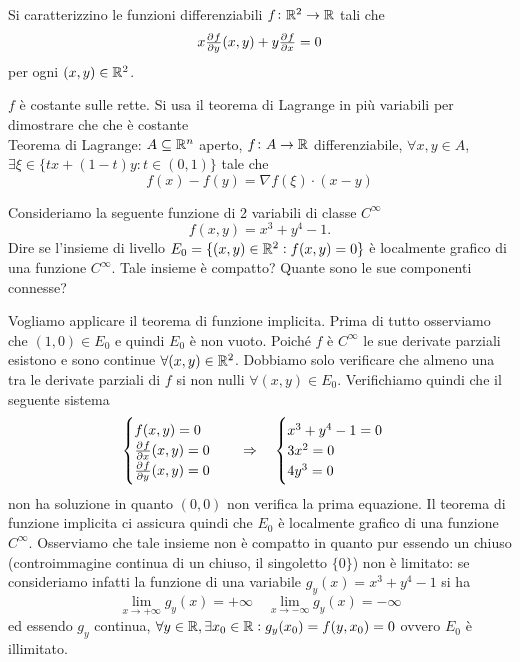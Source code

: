 \begin{es}
  Si caratterizzino le funzioni differenziabili $ f \colon \mathbb{R}^2 \to \mathbb{R} $ tali che \[ x \pd[]{f}{y}(x, y) + y \pd[]{f}{x} = 0\] per ogni $ (x, y) \in \mathbb{R}^2 $.
\end{es}
%
$ f $ è costante sulle rette. Si usa il teorema di Lagrange in più variabili per dimostrare che che è costante \\
Teorema di Lagrange: $ A \subseteq \mathbb{R}^n $ aperto, $ f \colon A \to \mathbb{R} $ differenziabile, $ \forall x, y \in A $, $ \exists \xi \in \{tx + (1-t)y : t \in (0, 1)\} $ tale che
\begin{equation*}
  f(x) - f(y) = \nabla{f}(\xi) \cdot (x - y)
\end{equation*}


\begin{es}
  Consideriamo la seguente funzione di 2 variabili di classe $ C^{\infty} $ \[f(x, y) = x^3 + y^4 - 1.\] Dire se l'insieme di livello $ E_0 = \{(x, y) \in \mathbb{R}^2 : f(x, y) = 0\} $ è localmente grafico di una funzione $ C^{\infty} $. Tale insieme è compatto? Quante sono le sue componenti connesse?
\end{es}
%
Vogliamo applicare il teorema di funzione implicita. Prima di tutto osserviamo che $ (1, 0) \in E_0 $ e quindi $ E_0 $ è non vuoto. Poiché $ f $ è $ C^{\infty} $ le sue derivate parziali esistono e sono continue $ \forall (x, y) \in \mathbb{R}^2 $. Dobbiamo solo verificare che almeno una tra le derivate parziali di $ f $ si non nulli $ \forall (x, y) \in E_0 $. Verifichiamo quindi che il seguente sistema
\begin{equation*}
  \begin{cases}
    f(x, y) = 0 \\
    \pd[]{f}{x}(x, y) = 0 \\
    \pd[]{f}{y}(x, y) = 0 \\
  \end{cases}
  \quad \Rightarrow \quad
  \begin{cases}
    x^3 + y^4 - 1 = 0 \\
    3x^2 = 0 \\
    4y^3 = 0 \\
  \end{cases}
\end{equation*}
non ha soluzione in quanto $ (0, 0) $ non verifica la prima equazione. Il teorema di funzione implicita ci assicura quindi che $ E_0 $ è localmente grafico di una funzione $ C^{\infty} $. Osserviamo che tale insieme non è compatto in quanto pur essendo un chiuso (controimmagine continua di un chiuso, il singoletto $ \{0\} $) non è limitato: se consideriamo infatti la funzione di una variabile $ g_y(x) = x^3 + y^4 - 1 $ si ha \[\lim_{x \to +\infty} g_y(x) = +\infty \quad \lim_{x \to -\infty} g_y(x) = -\infty\] ed essendo $ g_y $ continua, $ \forall y \in \mathbb{R}, \exists x_0 \in \mathbb{R} : g_y(x_0) = f(y, x_0) = 0 $ ovvero $ E_0 $ è illimitato.

